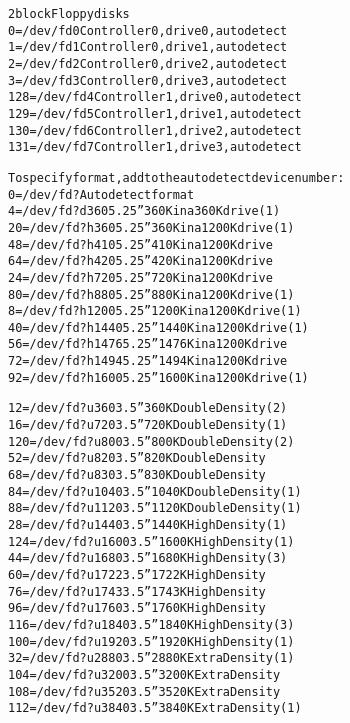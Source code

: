 \documentclass[a4paper,8pt,english]{sphinxmanual}
\begin{document}
\begin{alltt}
   2 block      Floppy disks
                  0 = /dev/fd0          Controller 0, drive 0, autodetect
                  1 = /dev/fd1          Controller 0, drive 1, autodetect
                  2 = /dev/fd2          Controller 0, drive 2, autodetect
                  3 = /dev/fd3          Controller 0, drive 3, autodetect
                128 = /dev/fd4          Controller 1, drive 0, autodetect
                129 = /dev/fd5          Controller 1, drive 1, autodetect
                130 = /dev/fd6          Controller 1, drive 2, autodetect
                131 = /dev/fd7          Controller 1, drive 3, autodetect

                To specify format, add to the autodetect device number:
                  0 = /dev/fd?          Autodetect format
                  4 = /dev/fd?d360      5.25''  360K in a 360K  drive(1)
                 20 = /dev/fd?h360      5.25''  360K in a 1200K drive(1)
                 48 = /dev/fd?h410      5.25''  410K in a 1200K drive
                 64 = /dev/fd?h420      5.25''  420K in a 1200K drive
                 24 = /dev/fd?h720      5.25''  720K in a 1200K drive
                 80 = /dev/fd?h880      5.25''  880K in a 1200K drive(1)
                  8 = /dev/fd?h1200     5.25'' 1200K in a 1200K drive(1)
                 40 = /dev/fd?h1440     5.25'' 1440K in a 1200K drive(1)
                 56 = /dev/fd?h1476     5.25'' 1476K in a 1200K drive
                 72 = /dev/fd?h1494     5.25'' 1494K in a 1200K drive
                 92 = /dev/fd?h1600     5.25'' 1600K in a 1200K drive(1)

                 12 = /dev/fd?u360      3.5''   360K Double Density(2)
                 16 = /dev/fd?u720      3.5''   720K Double Density(1)
                120 = /dev/fd?u800      3.5''   800K Double Density(2)
                 52 = /dev/fd?u820      3.5''   820K Double Density
                 68 = /dev/fd?u830      3.5''   830K Double Density
                 84 = /dev/fd?u1040     3.5''  1040K Double Density(1)
                 88 = /dev/fd?u1120     3.5''  1120K Double Density(1)
                 28 = /dev/fd?u1440     3.5''  1440K High Density(1)
                124 = /dev/fd?u1600     3.5''  1600K High Density(1)
                 44 = /dev/fd?u1680     3.5''  1680K High Density(3)
                 60 = /dev/fd?u1722     3.5''  1722K High Density
                 76 = /dev/fd?u1743     3.5''  1743K High Density
                 96 = /dev/fd?u1760     3.5''  1760K High Density
                116 = /dev/fd?u1840     3.5''  1840K High Density(3)
                100 = /dev/fd?u1920     3.5''  1920K High Density(1)
                 32 = /dev/fd?u2880     3.5''  2880K Extra Density(1)
                104 = /dev/fd?u3200     3.5''  3200K Extra Density
                108 = /dev/fd?u3520     3.5''  3520K Extra Density
                112 = /dev/fd?u3840     3.5''  3840K Extra Density(1)


\end{alltt}
\end{document}
